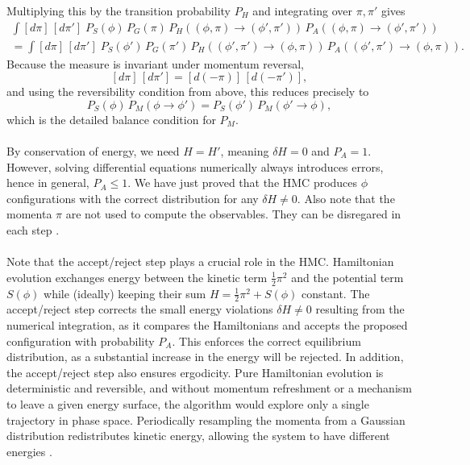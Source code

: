 Multiplying this by the transition probability $P_H$ and integrating over $\pi,\pi'$ gives
\begin{align}
    \int[d\pi]\,[d\pi']\;P_S(\phi)\,P_G(\pi)\,P_H((\phi,\pi)\to(\phi',\pi'))\, P_A((\phi,\pi)\to(\phi',\pi')) \\
    = \int[d\pi]\,[d\pi']\; P_S(\phi')\,P_G(\pi')\, P_H((\phi',\pi')\to(\phi,\pi))\, P_A((\phi',\pi')\to(\phi,\pi)).
\end{align}
Because the measure is invariant under momentum reversal,
\[
    [d\pi]\,[d\pi'] = [d(-\pi)]\,[d(-\pi')],
\]
and using the reversibility condition from above, this reduces precisely to
\begin{equation}
    P_S(\phi)\, P_M(\phi \to \phi') = P_S(\phi')\, P_M(\phi' \to \phi),
\end{equation}
which is the detailed balance condition for $P_M$.\\\\
By conservation of energy, we need $H = H'$, meaning $\delta H = 0$ and $P_A = 1$. However, solving differential equations numerically always introduces errors, hence
in general, $P_A \leq 1$. We have just proved that the HMC produces $\phi$ configurations with the correct distribution for any $\delta H \neq 0$. Also note that the momenta 
$\pi$ are not used to compute the observables. They can be disregared in each step \cite{Duane1987HMC}.\\\\
Note that the accept/reject step plays a crucial role in the HMC. Hamiltonian evolution exchanges energy between the kinetic term $\tfrac{1}{2}\pi^2$ and the potential term 
$S(\phi)$ while (ideally) keeping their sum $H = \tfrac{1}{2}\pi^2 + S(\phi)$ constant. The accept/reject step corrects the small energy violations $\delta H \neq 0$ resulting 
from the numerical integration, as it compares the Hamiltonians and accepts the proposed configuration with probability $P_A$. This enforces the correct equilibrium distribution, 
as a substantial increase in the energy will be rejected. In addition, the accept/reject step also ensures ergodicity. Pure Hamiltonian evolution is deterministic and reversible, 
and without momentum refreshment or a mechanism to leave a given energy surface, the algorithm would explore only a single trajectory in phase space. Periodically resampling the 
momenta from a Gaussian distribution redistributes kinetic energy, allowing the system to have different energies \cite{Duane1987HMC}. 